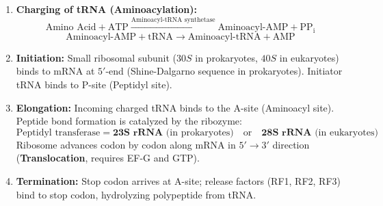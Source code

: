\documentclass[10pt,a4paper]{article}
\begin{document}
\begin{conceptbox}
\begin{enumerate}[leftmargin=*]
  \item \textbf{Charging of tRNA (Aminoacylation):}
  \begin{equation}
    \text{Amino Acid} + \text{ATP} \xrightarrow{\text{Aminoacyl-tRNA synthetase}} \text{Aminoacyl-AMP} + \mathrm{PP_i}
  \end{equation}
  \begin{equation}
    \text{Aminoacyl-AMP} + \text{tRNA} \longrightarrow \text{Aminoacyl-tRNA} + \text{AMP}
  \end{equation}
  \item \textbf{Initiation:} Small ribosomal subunit ($30S$ in prokaryotes, $40S$ in eukaryotes) binds to mRNA at $5'$-end (Shine-Dalgarno sequence in prokaryotes). Initiator tRNA binds to P-site (Peptidyl site).
  \item \textbf{Elongation:} Incoming charged tRNA binds to the A-site (Aminoacyl site). Peptide bond formation is catalyzed by the ribozyme:
  \begin{equation}
    \text{Peptidyl transferase} = \mathbf{23S\text{ rRNA}} \text{ (in prokaryotes)} \quad \text{or} \quad \mathbf{28S\text{ rRNA}} \text{ (in eukaryotes)}
  \end{equation}
  Ribosome advances codon by codon along mRNA in $5'\to 3'$ direction (\textbf{Translocation}, requires EF-G and GTP).
  \item \textbf{Termination:} Stop codon arrives at A-site; release factors (RF1, RF2, RF3) bind to stop codon, hydrolyzing polypeptide from tRNA.
\end{enumerate}
\end{conceptbox}
\end{document}
